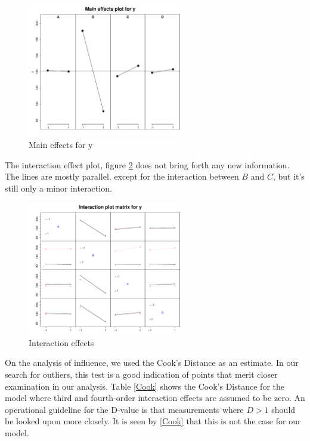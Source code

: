\begin{figure}[H]
    \centering
    \includegraphics[width=0.6\textwidth]{PDF/mainEffects4factors.pdf}
    \caption{Main effects for y}
    \label{fig:mainEff}
\end{figure}

The interaction effect plot, figure \ref{fig:interaction} does not bring forth any new information. The lines are mostly parallel, except  for the interaction between $B$ and $C$, but it's still only a minor interaction.

\begin{figure}[H]
    \centering
    \includegraphics[width=0.6\textwidth]{PDF/interactionPlot4factors.pdf}
    \caption{Interaction effects}
    \label{fig:interaction}
\end{figure}

On the analysis of influence, we used the Cook's Distance as an estimate. In our search for outliers, this test is a good indication of points that merit closer examination in our analysis. Table \ref{Cook} shows the Cook's Distance for the model where third and fourth-order interaction effects are assumed to be zero. An operational guideline for the D-value is that measurements where $D>1$ should be looked upon more closely. It is seen by \ref{Cook} that this is not the case for our model.

